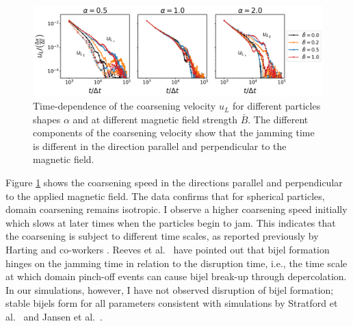 \begin{figure}
\includegraphics[width=\textwidth]{figures/results/paper1/coarsening_vel.png}
\caption{Time-dependence of the coarsening velocity $u_L$ for different particles shapes $\alpha$  
and at different magnetic field strength $\bar{B}$. The different components of the coarsening velocity 
show that the jamming time is different in the direction parallel and perpendicular to the magnetic field.}
\label{fig:coarsening_velocity}
\end{figure}

Figure \ref{fig:coarsening_velocity} shows the coarsening speed in the directions parallel and perpendicular to the applied magnetic field. 
The data confirms that for spherical particles, domain coarsening remains isotropic. I observe a higher coarsening speed initially which slows 
at later times when the particles begin to jam. This indicates that the
coarsening is subject to different time scales, as reported previously
by Harting and co-workers \cite{gunther_timescales_2014}. Reeves et
al.~\cite{reeves_particle-size_2015} have pointed out that bijel
formation hinges on the jamming time in relation to the disruption time, i.e., the time scale at which domain pinch-off events can cause bijel break-up through 
depercolation. In our simulations, however, I have not observed disruption of bijel formation; stable bijels form for all parameters consistent with simulations 
by Stratford et
al.~\cite{stratford_colloidal_2005} and Jansen et al.~\cite{jansen_bijels_2011}.

